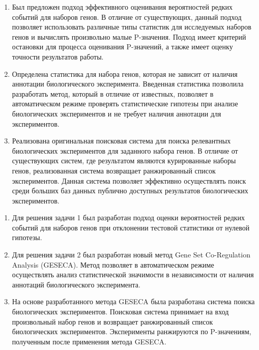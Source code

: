 {\novelty}
\begin{enumerate}[beginpenalty=10000] %
    \item Был предложен подход эффективного оценивания вероятностей редких событий для наборов генов.
    В отличие от существующих, данный подход позволяет использовать различные типы статистик для исследуемых наборов генов и вычислять произвольно малые P-значения. 
    Подход имеет критерий остановки для процесса оценивания P-значений, а также имеет оценку точности результатов работы.
    \item Определена статистика для набора генов, которая не зависит от наличия аннотации биологического эксперимента.
    Введенная статистика позволила разработать метод, который в отличие от известных, позволяет в автоматическом режиме проверять статистические гипотезы при анализе биологических экспериментов и не требует наличия аннотации для экспериментов.
    \item Реализована оригинальная поисковая система для поиска релевантных биологических экспериментов для заданного набора генов.
    В отличие от существующих систем, где результатом являются курированные наборы генов, реализованная система возвращает ранжированный список экспериментов. Данная система позволяет эффективно осуществлять поиск среди больших баз данных публично доступных результатов биологических экспериментов.
\end{enumerate}

{}
\begin{enumerate}[beginpenalty=10000] %
    \item Для решения задачи 1 был разработан подход оценки вероятностей редких событий для наборов генов при отклонении тестовой статистики от нулевой гипотезы.
    \item Для решения задачи 2 был разработан новый метод Gene Set Co-Regulation Analysis (GESECA). Метод позволяет в автоматическом режиме осуществлять анализ статистической значимости в независимости от наличия аннотаций биологического эксперимента.
    \item На основе разработанного метода GESECA была разработана система поиска биологических экспериментов. Поисковая система принимает на вход произвольный набор генов и возвращает ранжированный список биологических экспериментов. Эксперименты ранжируются по P-значениям, полученным после применения метода GESECA. 
\end{enumerate}


